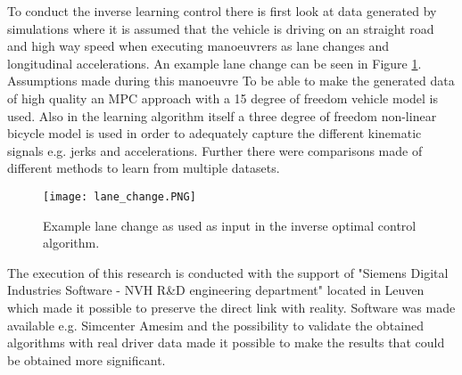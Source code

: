 To conduct the inverse learning control there is first look at data generated by simulations where it is assumed that the vehicle is driving on an straight road and high way speed when executing manoeuvrers as lane changes and longitudinal accelerations. An example lane change can be seen in Figure \ref{fig:lane_change}. Assumptions made during this manoeuvre  To be able to make the generated data of high quality an MPC approach with a 15 degree of freedom vehicle model is used. Also in the learning algorithm itself a three degree of freedom non-linear bicycle model is used in order to adequately capture the different kinematic signals e.g. jerks and accelerations. Further there were comparisons made of different methods to learn from multiple datasets. \\

\begin{figure}[htp]
	\centering
	\texttt{[image: lane\_change.PNG]}
	\caption{Example lane change as used as input in the inverse optimal control algorithm.}
	\label{fig:lane_change}
\end{figure}

The execution of this research is conducted with the support of "Siemens Digital Industries Software - NVH R\&D engineering department" located in Leuven which made it possible to preserve the direct link with reality. Software was made available e.g. Simcenter Amesim and the possibility to validate the obtained algorithms with real driver data made it possible to make the results that could be obtained more significant.\\


%
%


